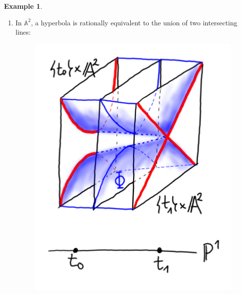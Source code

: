 \documentclass[12pt,a4paper]{amsart}
\theoremstyle{plain}
\theoremstyle{definition}
\newtheorem{exmp}[thm]{Example}
\theoremstyle{remark}
\begin{document}
\begin{exmp}
\begin{enumerate}
	\item In $\mathbb{A}^{2}$, a hyperbola is rationally equivalent to the union of two intersecting lines:
	    \begin{figure}[H]
		\centering
		\includegraphics[scale=.2]{pictures/hyperbola}
	    \end{figure}
    \end{enumerate}
\end{exmp}
\end{document}
